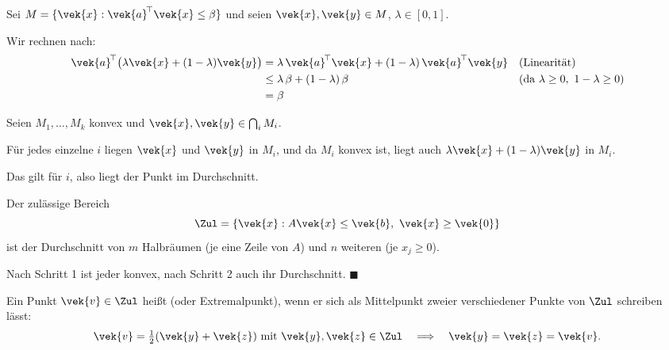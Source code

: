 \begin{merksatz}
Sei $M = \{\vek{x} : \vek{a}^{\!\top}\vek{x} \le \beta\}$ und seien $\vek{x},\vek{y} \in M$, $\lambda \in [0,1]$.

Wir rechnen nach:
\begin{align*}
\vek{a}^{\!\top}\bigl(\lambda\vek{x}+(1-\lambda)\vek{y}\bigr)
&= \lambda\,\vek{a}^{\!\top}\vek{x} + (1-\lambda)\,\vek{a}^{\!\top}\vek{y} && \text{(Linearität)}\\
&\le \lambda\,\beta + (1-\lambda)\,\beta && \text{(da } \lambda \ge 0,\ 1-\lambda \ge 0)\\
&= \beta
\end{align*}

\begin{center}
\begin{minipage}{0.88\textwidth}
\end{minipage}
\end{center}

Seien $M_1,\ldots,M_k$ konvex und $\vek{x},\vek{y} \in \bigcap_i M_i$.

Für jedes einzelne $i$ liegen $\vek{x}$ und $\vek{y}$ in $M_i$, und da $M_i$ konvex ist, liegt auch $\lambda\vek{x}+(1-\lambda)\vek{y}$ in $M_i$.

Das gilt für  $i$, also liegt der Punkt im Durchschnitt. \checkmark

Der zulässige Bereich
\[ \Zul = \{\vek{x} : A\vek{x} \le \vek{b},\ \vek{x} \ge \vek{0}\} \]
ist der Durchschnitt von $m$ Halbräumen (je eine Zeile von $A$) und $n$ weiteren (je $x_j \ge 0$).

Nach Schritt 1 ist jeder konvex, nach Schritt 2 auch ihr Durchschnitt. $\blacksquare$
\end{merksatz}

\begin{definition}
Ein Punkt $\vek{v} \in \Zul$ heißt  (oder Extremalpunkt), wenn er sich  als Mittelpunkt zweier verschiedener Punkte von $\Zul$ schreiben lässt:
\[ \vek{v} = \tfrac12(\vek{y}+\vek{z}) \ \text{mit}\ \vek{y},\vek{z}\in\Zul \quad\Longrightarrow\quad \vek{y}=\vek{z}=\vek{v} . \]
\end{definition}

